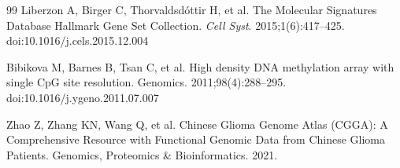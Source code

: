 \documentclass[11pt, letterpaper]{article}
\begin{document}
\begin{thebibliography}{99}
Liberzon A, Birger C, Thorvaldsdóttir H, et al.
The Molecular Signatures Database Hallmark Gene Set Collection.
\textit{Cell Syst}. 2015;1(6):417--425. doi:10.1016/j.cels.2015.12.004

Bibikova M, Barnes B, Tsan C, et al.
High density DNA methylation array with single CpG site resolution.
Genomics. 2011;98(4):288--295. doi:10.1016/j.ygeno.2011.07.007

Zhao Z, Zhang KN, Wang Q, et al.
Chinese Glioma Genome Atlas (CGGA): A Comprehensive Resource with Functional Genomic Data from Chinese Glioma Patients. Genomics, Proteomics \& Bioinformatics. 2021.

\end{thebibliography}
\end{document}
